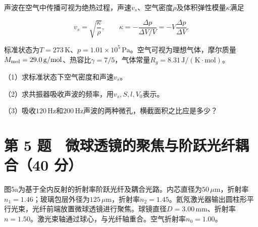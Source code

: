 \documentclass[12pt,a4paper,fontset=fandol]{ctexart}
\begin{document}
声波在空气中传播可视为绝热过程，声速\(v_s\)、空气密度\(\rho\)及体积弹性模量\(\kappa\)满足

\[
v_s=\sqrt{\frac{\kappa}{\rho}},
\qquad
\kappa=-\frac{\Delta p}{\Delta V/V}
=-V\frac{\Delta p}{\Delta V}.
\]

标准状态为\(T=273\,\mathrm K\)、\(p=1.01\times10^5\,\mathrm{Pa}\)。空气可视为理想气体，摩尔质量\(M_{\rm mol}=29.0\,\mathrm{g/mol}\)、热容比\(\gamma=7/5\)，气体常量\(R_g=8.31\,\mathrm{J/(K\cdot mol)}\)。

（1）求标准状态下空气密度和声速\(v_s\)。

（2）求共振器吸收声波的频率，用\(v_s,S,l,V_0\)表示。

（3）吸收\(120\,\mathrm{Hz}\)和\(200\,\mathrm{Hz}\)声波的两种微孔，横截面积之比应是多少？

\clearpage

\section{第 5 题　微球透镜的聚焦与阶跃光纤耦合（40
分）}\label{ux7b2c-5-ux9898-ux5faeux7403ux900fux955cux7684ux805aux7126ux4e0eux9636ux8dc3ux5149ux7ea4ux8026ux540840-ux5206}

图5a为基于全内反射的折射率阶跃光纤及耦合光路。内芯直径为\(50\,\mu\mathrm m\)，折射率\(n_1=1.46\)；玻璃包层外径为\(125\,\mu\mathrm m\)，折射率\(n_2=1.45\)。氦氖激光器输出圆柱形平行光束，光纤前端放置微球透镜进行聚焦。球镜直径\(D=3.00\,\mathrm{mm}\)、折射率\(n=1.50\)。激光束轴通过球心，与光纤轴重合。空气折射率\(n_0=1.00\)。

\begin{center}
\begin{minipage}{\linewidth}
\centering\begingroup{}
\ifdim\wd\diagrambox>.88\linewidth
\sbox{\diagrambox}{\resizebox{.88\linewidth}{!}{\usebox{\diagrambox}}}\fi
\ifdim\ht\diagrambox>.20\textheight
\resizebox{!}{.20\textheight}{\usebox{\diagrambox}}
\else\usebox{\diagrambox}\fi
\par{}\endgroup\end{minipage}\end{center}
\end{document}
